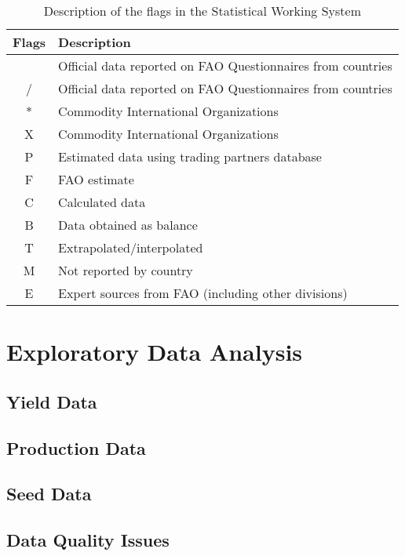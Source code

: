 \documentclass[nojss]{jss}\usepackage[]{graphicx}\usepackage[]{color}
\begin{document}
\begin{table}[h!]
  \label{tab:swsflag}
  \caption{Description of the flags in the Statistical Working System}
  \begin{center}
    \begin{tabular}{|c||p{12cm}|}
      \hline
      Flags & Description\\
      \hline
      & Official data reported on FAO Questionnaires from countries\\
      / & Official data reported on FAO Questionnaires from countries\\
      * & Commodity International Organizations\\
      X & Commodity International Organizations\\
      P & Estimated data using trading partners database\\
      F & FAO estimate\\
      C & Calculated data\\
      B & Data obtained as balance\\
      T & Extrapolated/interpolated\\
      M & Not reported by country\\
      E & Expert sources from FAO (including other divisions)\\
      \hline
    \end{tabular}
  \end{center}  
\end{table}

\section{Exploratory Data Analysis}

\subsection{Yield Data}

\subsection{Production Data}

\subsection{Seed Data}

\subsection{Data Quality Issues}
\end{document}
